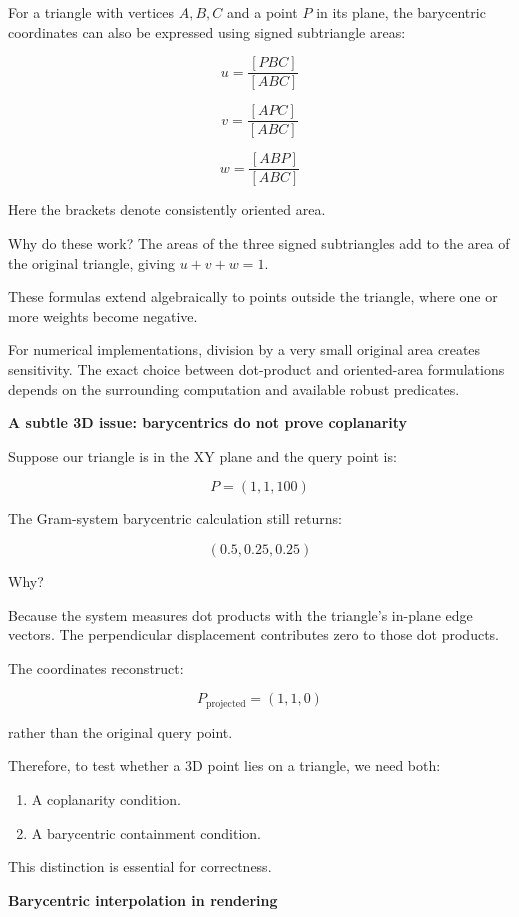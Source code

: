 For a triangle with vertices \(A,B,C\) and a point \(P\) in its plane, the barycentric coordinates can also be expressed using signed subtriangle areas:

\[
u=\frac{[PBC]}{[ABC]}
\]

\[
v=\frac{[APC]}{[ABC]}
\]

\[
w=\frac{[ABP]}{[ABC]}
\]

Here the brackets denote consistently oriented area.

Why do these work? The areas of the three signed subtriangles add to the area of the original triangle, giving \(u+v+w=1\).

These formulas extend algebraically to points outside the triangle, where one or more weights become negative.

For numerical implementations, division by a very small original area creates sensitivity. The exact choice between dot-product and oriented-area formulations depends on the surrounding computation and available robust predicates.

\textbf{A subtle 3D issue: barycentrics do not prove coplanarity}

Suppose our triangle is in the XY plane and the query point is:

\[
P=(1,1,100)
\]

The Gram-system barycentric calculation still returns:

\[
(0.5,0.25,0.25)
\]

Why?

Because the system measures dot products with the triangle's in-plane edge vectors. The perpendicular displacement contributes zero to those dot products.

The coordinates reconstruct:

\[
P_{\mathrm{projected}}=(1,1,0)
\]

rather than the original query point.

Therefore, to test whether a 3D point lies on a triangle, we need both:

\begin{enumerate}
\def\labelenumi{\arabic{enumi}.}
\tightlist
\item
  A coplanarity condition.
\item
  A barycentric containment condition.
\end{enumerate}

This distinction is essential for correctness.

\textbf{Barycentric interpolation in rendering}

